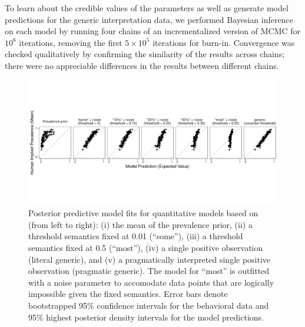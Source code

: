 \documentclass[floatsintext,doc]{apa6}
\begin{document}
To learn about the credible values of the parameters as well as generate model predictions for the generic interpretation data, we performed Bayesian inference on each model by running four chains of an incrementalized version of MCMC \cite{Ritchie2016} for $10^6$ iterations, removing the first $5 \times 10^5$ iterations for burn-in.
Convergence was checked qualitatively by confirming the similarity of the results across chains; there were no appreciable differences in the results between different chains.



\begin{figure}
\centering
\includegraphics{figs/genint-modelingResults-variousFixeds-1.pdf}
\caption{\label{fig:genint-modelingResults}Posterior predictive model fits for quantitative models based on (from left to right): (i) the mean of the prevalence prior, (ii) a threshold semantics fixed at 0.01 (\enquote{some}), (iii) a threshold semantics fixed at 0.5 (\enquote{most}), (iv) a single positive observation (literal generic), and (v) a pragmatically interpreted single positive observation (pragmatic generic). The model for \enquote{most} is outfitted with a noise parameter to accomodate data points that are logically impossible given the fixed semantics. Error bars denote bootstrapped 95\% confidence intervals for the behavioral data and 95\% highest posterior density intervals for the model predictions.}
\end{figure}
\end{document}
